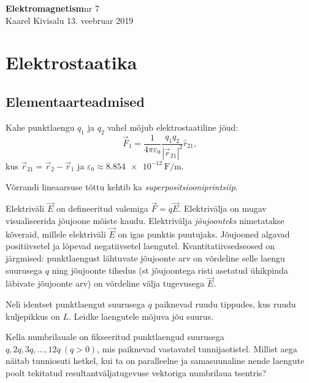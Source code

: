 \documentclass[a4paper,11pt,twocolumn]{article}
\begin{document}
{\huge \textbf{Elektromagnetism}\hfill \normalsize{nr 7}} \\
{Kaarel Kivisalu \hfill 13. veebruar 2019}

\section{Elektrostaatika}
\subsection{Elementaarteadmised}
Kahe punktlaengu \( q_1 \) ja \( q_2 \) vahel mõjub elektrostaatiline jõud:
\begin{equation*}
    \vec{F}_{1} = \dfrac{1}{4\pi\varepsilon_0 }\dfrac{q_1 q_2}{|\vec{r}_{21}|^2}\hat{r}_{21} \tag{Coulomb'i seadus},
\end{equation*}
kus \( \vec{r}_{21}=\vec{r}_2-\vec{r}_1 \) ja \( \varepsilon_0\approx\SI{8.854e-12}{\F\per\m} \).

Võrrandi lineaarsuse tõttu kehtib ka \textit{superpositsiooniprintsiip}.

Elektriväli \( \vec{E} \) on defineeritud valemiga \( \vec{F}=q\vec{E} \). Elektrivälja on mugav visualiseerida jõujoone mõiste kaudu. Elektrivälja \textit{jõujoonteks} nimetatakse kõveraid, millele elektriväli \( \vec{E} \) on igas punktis puutujaks. Jõujooned algavad positiivsetel ja lõpevad negatiivsetel laengutel. Kvantitatiivsedseosed on järgmised: punktlaengust lähtuvate jõujoonte arv on võrdeline selle laengu suurusega \( q \) ning jõujoonte tihedus (st jõujoontega risti asetatud ühikpinda läbivate jõujoonte arv) on võrdeline välja tugevusega \( \vec{E} \).
\begin{question}
    Neli identset punktlaengut suurusega \( q \) paiknevad ruudu tippudes, kus ruudu kuljepikkus on \( L \). Leidke laengutele mõjuva jõu suurus.
\end{question}

\begin{question}
    Kella numbrilauale on fikseeritud punktlaengud suurusega \( q, 2q, 3q,..., 12q\ (q > 0) \), mis paiknevad vastavatel tunnijaotistel. Millist aega näitab tunniosuti hetkel, kui ta on paralleelne ja samasuunaline nende laengute poolt tekitatud resultantväljatugevuse vektoriga numbrilaua tsentris?
\end{question}
\end{document}

